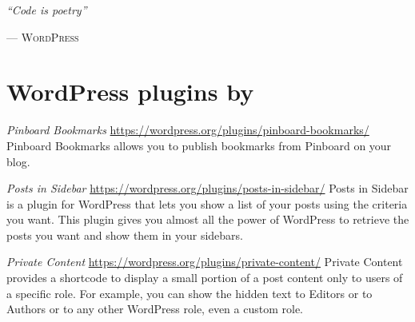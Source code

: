 \begin{flushright}
	\normalsize
	\textit{``Code is poetry''}\medskip

	\scriptsize --- \textsc{WordPress}
\end{flushright}

\vfill

\begingroup

	\footnotesize

	\section*{WordPress plugins by \myName}

	\begin{description}
		\item \emph{Pinboard Bookmarks}\newline
		\url{https://wordpress.org/plugins/pinboard-bookmarks/}\newline
		Pinboard Bookmarks allows you to publish bookmarks from Pinboard on your
		blog.
		\item \emph{Posts in Sidebar}\newline
		\url{https://wordpress.org/plugins/posts-in-sidebar/}\newline
		Posts in Sidebar is a plugin for WordPress that lets you show a list of
		your posts using the criteria you want. This plugin gives you almost all
		the power of WordPress to retrieve the posts you want and show them in
		your sidebars.
		\item \emph{Private Content}\newline
		\url{https://wordpress.org/plugins/private-content/}\newline
		Private Content provides a shortcode to display a small portion of a
		post content only to users of a specific role. For example, you can show
		the hidden text to Editors or to Authors or to any other WordPress role,
		even a custom role.
	\end{description}

\endgroup
